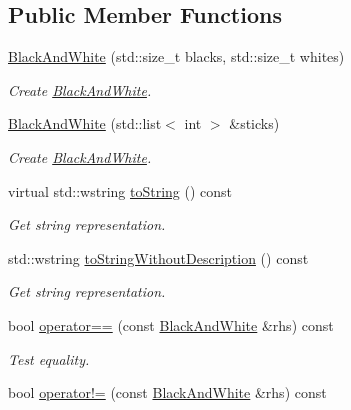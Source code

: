 \subsection*{Public Member Functions}
\begin{DoxyCompactItemize}
\item 
\hyperlink{classmastermind_1_1logic_1_1_black_and_white_a4dbd770b9f1ba3bef45ebba9fc01dcf4}{Black\+And\+White} (std\+::size\+\_\+t blacks, std\+::size\+\_\+t whites)
\begin{DoxyCompactList}\small\item\em Create \hyperlink{classmastermind_1_1logic_1_1_black_and_white}{Black\+And\+White}. \end{DoxyCompactList}\item 
\hyperlink{classmastermind_1_1logic_1_1_black_and_white_af6fc312cb65dcb1cc53f6e75cf45861d}{Black\+And\+White} (std\+::list$<$ int $>$ \&sticks)
\begin{DoxyCompactList}\small\item\em Create \hyperlink{classmastermind_1_1logic_1_1_black_and_white}{Black\+And\+White}. \end{DoxyCompactList}\item 
virtual std\+::wstring \hyperlink{classmastermind_1_1logic_1_1_black_and_white_aaa1108efb71702c9cdf6ac9a9ad4a0c9}{to\+String} () const
\begin{DoxyCompactList}\small\item\em Get string representation. \end{DoxyCompactList}\item 
std\+::wstring \hyperlink{classmastermind_1_1logic_1_1_black_and_white_a38779882fc72d356a660026e047eafb9}{to\+String\+Without\+Description} () const
\begin{DoxyCompactList}\small\item\em Get string representation. \end{DoxyCompactList}\item 
bool \hyperlink{classmastermind_1_1logic_1_1_black_and_white_ade7da8e1b846896a978f619b9689a7cb}{operator==} (const \hyperlink{classmastermind_1_1logic_1_1_black_and_white}{Black\+And\+White} \&rhs) const
\begin{DoxyCompactList}\small\item\em Test equality. \end{DoxyCompactList}\item 
bool \hyperlink{classmastermind_1_1logic_1_1_black_and_white_a8d622959805faeb3f63b0342667b58f7}{operator!=} (const \hyperlink{classmastermind_1_1logic_1_1_black_and_white}{Black\+And\+White} \&rhs) const

\end{DoxyCompactItemize}
